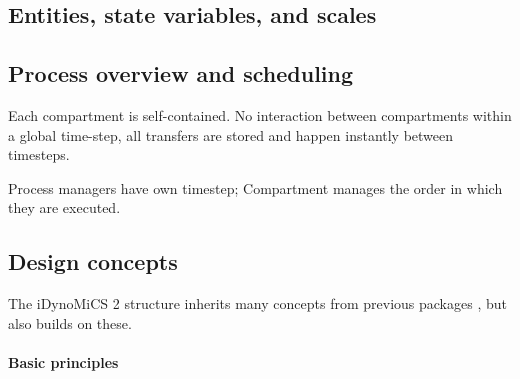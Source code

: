 \documentclass[10pt,letterpaper]{article}
\begin{document}
\subsection*{Entities, state variables, and scales}


\subsection*{Process overview and scheduling}
Each compartment is self-contained.
No interaction between compartments within a global time-step, all transfers are stored and happen instantly between timesteps.

Process managers have own timestep; Compartment manages the order in which they are executed.

\subsection*{Design concepts}
The iDynoMiCS 2 structure inherits many concepts from previous packages \cite{Kreft1998, Lardon2011}, but also builds on these.

\paragraph{Basic principles}
\end{document}
